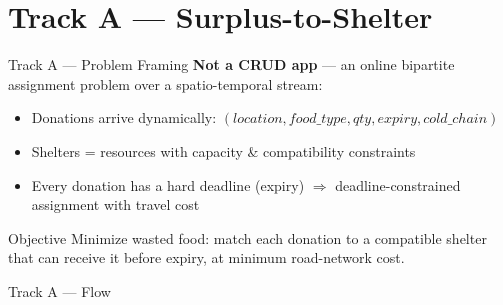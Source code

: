 \documentclass[10pt,aspectratio=169]{beamer}
\begin{document}
\section{Track A — Surplus-to-Shelter}

\begin{frame}{Track A — Problem Framing}
  \textbf{Not a CRUD app} — an \alert{online bipartite assignment} problem over a
  spatio-temporal stream:
  \begin{itemize}
    \item Donations arrive dynamically:
      $(location, food\_type, qty, expiry, cold\_chain)$
    \item Shelters = resources with capacity \& compatibility constraints
    \item Every donation has a \alert{hard deadline} (expiry) $\Rightarrow$
      deadline-constrained assignment with travel cost
  \end{itemize}

  \begin{block}{Objective}
    Minimize wasted food: match each donation to a compatible shelter that can
    receive it before expiry, at minimum road-network cost.
  \end{block}
\end{frame}

\begin{frame}{Track A — Flow}
  \begin{center}
  \end{center}
\end{frame}
\end{document}
